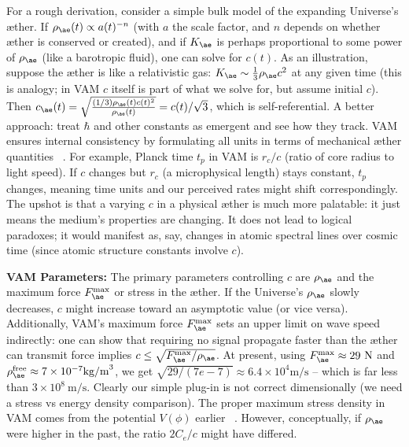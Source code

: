 \documentclass[a4paper, aps,preprint,superscriptaddress, 12pt]{revtex4}
\begin{document}
For a rough derivation, consider a simple bulk model of the expanding Universe’s æther. If $\rho_{\ae}(t) \propto a(t)^{-n}$ (with $a$ the scale factor, and $n$ depends on whether æther is conserved or created), and if $K_{\ae}$ is perhaps proportional to some power of $\rho_{\ae}$ (like a barotropic fluid), one can solve for $c(t)$. As an illustration, suppose the æther is like a relativistic gas: $K_{\ae}\sim \frac{1}{3}\rho_{\ae}c^2$ at any given time (this is analogy; in VAM $c$ itself is part of what we solve for, but assume initial $c$). Then $c_{\ae}(t) = \sqrt{\frac{(1/3)\rho_{\ae}(t)c(t)^2}{\rho_{\ae}(t)}} = c(t)/\sqrt{3}$, which is self-referential. A better approach: treat $\hbar$ and other constants as emergent and see how they track. VAM ensures internal consistency by formulating all units in terms of mechanical æther quantities~\cite{Iskandarani2025c} . For example, Planck time $t_p$ in VAM is $r_c/c$ (ratio of core radius to light speed). If $c$ changes but $r_c$ (a microphysical length) stays constant, $t_p$ changes, meaning time units and our perceived rates might shift correspondingly. The upshot is that a varying $c$ in a physical æther is much more palatable: it just means the medium’s properties are changing. It does not lead to logical paradoxes; it would manifest as, say, changes in atomic spectral lines over cosmic time (since atomic structure constants involve $c$).


\textbf{VAM Parameters:} The primary parameters controlling $c$ are $\rho_{\ae}$ and the maximum force $F_{\ae}^{\max}$ or stress in the æther. If the Universe’s $\rho_{\ae}$ slowly decreases, $c$ might increase toward an asymptotic value (or vice versa). Additionally, VAM’s maximum force $F_{\ae}^{\max}$ sets an upper limit on wave speed indirectly: one can show that requiring no signal propagate faster than the æther can transmit force implies $c \le \sqrt{F_{\ae}^{\max}/\rho_{\ae}}$. At present, using $F_{\ae}^{\max}\approx29~\text{N}$ and $\rho_{\ae}^{\text{free}}\approx7\times10^{-7}\text{kg/m}^3$, we get $\sqrt{29/(7e-7)}\approx6.4\times10^4\text{m/s}$ – which is far less than $3\times10^8~\text{m/s}$. Clearly our simple plug-in is not correct dimensionally (we need a stress vs energy density comparison). The proper maximum stress density in VAM comes from the potential $V(\phi)$ earlier~\cite{Iskandarani2025c} . However, conceptually, if $\rho_{\ae}$ were higher in the past, the ratio $2C_e/c$ might have differed.
\end{document}
